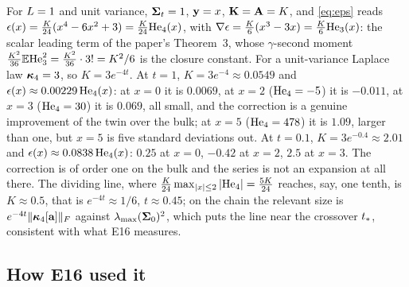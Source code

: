 \begin{example}
\label{ex:edgeworth-scalar}
For $L=1$ and unit variance, $\mathbf{\Sigma}_t=1$, $\mathbf{y}=x$, $\mathbf{K}=\mathbf{A}=K$, and
\cref{eq:eps} reads $\epsilon(x)=\tfrac{K}{24}(x^4-6x^2+3)=\tfrac{K}{24}\mathrm{He}_{4}(x)$, with
$\nabla\epsilon=\tfrac K6(x^3-3x)=\tfrac K6\mathrm{He}_{3}(x)$: the scalar leading term of the
paper's Theorem~3, whose $\gamma$-second moment $\tfrac{K^2}{36}\mathbb{E}\mathrm{He}_{3}^2=\tfrac{K^2}{36}\cdot3!=K^2/6$
is the closure constant. For a unit-variance Laplace law $\bm{\kappa}_4=3$, so $K=3e^{-4t}$.
At $t=1$, $K=3e^{-4}\approx0.0549$ and $\epsilon(x)\approx0.00229\,\mathrm{He}_{4}(x)$: at
$x=0$ it is $0.0069$, at $x=2$ ($\mathrm{He}_{4}=-5$) it is $-0.011$, at $x=3$ ($\mathrm{He}_{4}=30$) it
is $0.069$, all small, and the correction is a genuine improvement of the twin over
the bulk; at $x=5$ ($\mathrm{He}_{4}=478$) it is $1.09$, larger than one, but $x=5$ is five
standard deviations out. At $t=0.1$, $K=3e^{-0.4}\approx2.01$ and
$\epsilon(x)\approx0.0838\,\mathrm{He}_{4}(x)$: $0.25$ at $x=0$, $-0.42$ at $x=2$, $2.5$ at
$x=3$. The correction is of order one on the bulk and the series is not an expansion
at all there. The dividing line, where $\tfrac{K}{24}\max_{|x|\le2}|\mathrm{He}_{4}|=\tfrac{5K}{24}$
reaches, say, one tenth, is $K\approx0.5$, that is $e^{-4t}\approx1/6$, $t\approx0.45$; on
the chain the relevant size is $e^{-4t}\lVert \bm{\kappa}_4[\mathbf{a}] \rVert_{F}$ against $\lambda_{\max}(\mathbf{\Sigma}_0)^2$,
which puts the line near the crossover $t_{*}$, consistent with what E16 measures.
\end{example}

\subsection{How E16 used it}


